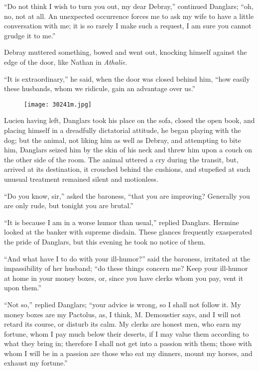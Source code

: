 “Do not think I wish to turn you out, my dear Debray,” continued
Danglars; “oh, no, not at all. An unexpected occurrence forces me to
ask my wife to have a little conversation with me; it is so rarely I
make such a request, I am sure you cannot grudge it to me.”

Debray muttered something, bowed and went out, knocking himself against
the edge of the door, like Nathan in \textit{Athalie}.

“It is extraordinary,” he said, when the door was closed behind him,
“how easily these husbands, whom we ridicule, gain an advantage over
us.”

\begin{figure}[ht]
\texttt{[image: 30241m.jpg]}
\end{figure}

Lucien having left, Danglars took his place on the sofa, closed the
open book, and placing himself in a dreadfully dictatorial attitude, he
began playing with the dog; but the animal, not liking him as well as
Debray, and attempting to bite him, Danglars seized him by the skin of
his neck and threw him upon a couch on the other side of the room. The
animal uttered a cry during the transit, but, arrived at its
destination, it crouched behind the cushions, and stupefied at such
unusual treatment remained silent and motionless.

“Do you know, sir,” asked the baroness, “that you are improving?
Generally you are only rude, but tonight you are brutal.”

“It is because I am in a worse humor than usual,” replied Danglars.
Hermine looked at the banker with supreme disdain. These glances
frequently exasperated the pride of Danglars, but this evening he took
no notice of them.

“And what have I to do with your ill-humor?” said the baroness,
irritated at the impassibility of her husband; “do these things concern
me? Keep your ill-humor at home in your money boxes, or, since you have
clerks whom you pay, vent it upon them.”

“Not so,” replied Danglars; “your advice is wrong, so I shall not
follow it. My money boxes are my Pactolus, as, I think, M. Demoustier
says, and I will not retard its course, or disturb its calm. My clerks
are honest men, who earn my fortune, whom I pay much below their
deserts, if I may value them according to what they bring in; therefore
I shall not get into a passion with them; those with whom I will be in
a passion are those who eat my dinners, mount my horses, and exhaust my
fortune.”

